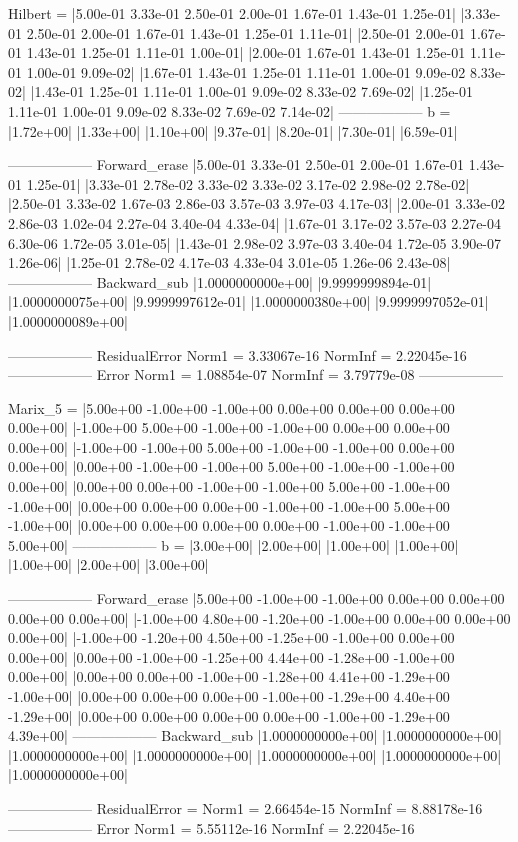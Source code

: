 \documentclass{jsarticle}
\begin{document}
Hilbert =
|5.00e-01	3.33e-01	2.50e-01	2.00e-01	1.67e-01	1.43e-01	1.25e-01|
|3.33e-01	2.50e-01	2.00e-01	1.67e-01	1.43e-01	1.25e-01	1.11e-01|
|2.50e-01	2.00e-01	1.67e-01	1.43e-01	1.25e-01	1.11e-01	1.00e-01|
|2.00e-01	1.67e-01	1.43e-01	1.25e-01	1.11e-01	1.00e-01	9.09e-02|
|1.67e-01	1.43e-01	1.25e-01	1.11e-01	1.00e-01	9.09e-02	8.33e-02|
|1.43e-01	1.25e-01	1.11e-01	1.00e-01	9.09e-02	8.33e-02	7.69e-02|
|1.25e-01	1.11e-01	1.00e-01	9.09e-02	8.33e-02	7.69e-02	7.14e-02|
------------------
 b =
|1.72e+00|
|1.33e+00|
|1.10e+00|
|9.37e-01|
|8.20e-01|
|7.30e-01|
|6.59e-01|

------------------
 Forward_erase
|5.00e-01	3.33e-01	2.50e-01	2.00e-01	1.67e-01	1.43e-01	1.25e-01|
|3.33e-01	2.78e-02	3.33e-02	3.33e-02	3.17e-02	2.98e-02	2.78e-02|
|2.50e-01	3.33e-02	1.67e-03	2.86e-03	3.57e-03	3.97e-03	4.17e-03|
|2.00e-01	3.33e-02	2.86e-03	1.02e-04	2.27e-04	3.40e-04	4.33e-04|
|1.67e-01	3.17e-02	3.57e-03	2.27e-04	6.30e-06	1.72e-05	3.01e-05|
|1.43e-01	2.98e-02	3.97e-03	3.40e-04	1.72e-05	3.90e-07	1.26e-06|
|1.25e-01	2.78e-02	4.17e-03	4.33e-04	3.01e-05	1.26e-06	2.43e-08|
------------------
 Backward_sub
|1.0000000000e+00|
|9.9999999894e-01|
|1.0000000075e+00|
|9.9999997612e-01|
|1.0000000380e+00|
|9.9999997052e-01|
|1.0000000089e+00|

------------------
 ResidualError
Norm1 = 3.33067e-16
NormInf = 2.22045e-16
------------------
 Error
Norm1 = 1.08854e-07
NormInf = 3.79779e-08
------------------

Marix_5 =
|5.00e+00	-1.00e+00	-1.00e+00	0.00e+00	0.00e+00	0.00e+00	0.00e+00|
|-1.00e+00	5.00e+00	-1.00e+00	-1.00e+00	0.00e+00	0.00e+00	0.00e+00|
|-1.00e+00	-1.00e+00	5.00e+00	-1.00e+00	-1.00e+00	0.00e+00	0.00e+00|
|0.00e+00	-1.00e+00	-1.00e+00	5.00e+00	-1.00e+00	-1.00e+00	0.00e+00|
|0.00e+00	0.00e+00	-1.00e+00	-1.00e+00	5.00e+00	-1.00e+00	-1.00e+00|
|0.00e+00	0.00e+00	0.00e+00	-1.00e+00	-1.00e+00	5.00e+00	-1.00e+00|
|0.00e+00	0.00e+00	0.00e+00	0.00e+00	-1.00e+00	-1.00e+00	5.00e+00|
------------------
 b =
|3.00e+00|
|2.00e+00|
|1.00e+00|
|1.00e+00|
|1.00e+00|
|2.00e+00|
|3.00e+00|

------------------
 Forward_erase
|5.00e+00	-1.00e+00	-1.00e+00	0.00e+00	0.00e+00	0.00e+00	0.00e+00|
|-1.00e+00	4.80e+00	-1.20e+00	-1.00e+00	0.00e+00	0.00e+00	0.00e+00|
|-1.00e+00	-1.20e+00	4.50e+00	-1.25e+00	-1.00e+00	0.00e+00	0.00e+00|
|0.00e+00	-1.00e+00	-1.25e+00	4.44e+00	-1.28e+00	-1.00e+00	0.00e+00|
|0.00e+00	0.00e+00	-1.00e+00	-1.28e+00	4.41e+00	-1.29e+00	-1.00e+00|
|0.00e+00	0.00e+00	0.00e+00	-1.00e+00	-1.29e+00	4.40e+00	-1.29e+00|
|0.00e+00	0.00e+00	0.00e+00	0.00e+00	-1.00e+00	-1.29e+00	4.39e+00|
------------------
 Backward_sub
|1.0000000000e+00|
|1.0000000000e+00|
|1.0000000000e+00|
|1.0000000000e+00|
|1.0000000000e+00|
|1.0000000000e+00|
|1.0000000000e+00|

------------------
 ResidualError =
Norm1 = 2.66454e-15
NormInf = 8.88178e-16
------------------
 Error
Norm1 = 5.55112e-16
NormInf = 2.22045e-16
\end{document}
